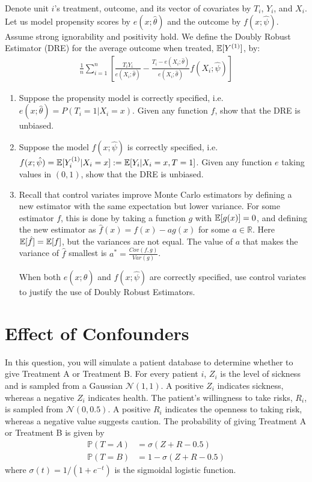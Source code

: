 \documentclass[11pt]{article}
\begin{document}
Denote unit $i$'s treatment, outcome, and its vector of covariates by $T_i$, $Y_i$, and $X_i$. Let us model propensity scores by $e(x;\hat\theta)$ and the outcome by $f(x;\hat{\psi})$. Assume strong ignorability and positivity hold. We define the Doubly Robust Estimator (DRE) for the average outcome when treated, $\mathbb{E}[Y^{(1)}]$, by:
\begin{align}
    \frac{1}{n}\sum_{i=1}^n \left[\frac{T_iY_i}{e(X_i;\hat\theta)} - \frac{T_i - e(X_i;\hat\theta)}{e(X_i;\hat\theta)}f(X_i;\hat{\psi})\right]
\end{align}
\begin{enumerate}[label=(\Alph*)]

    \item Suppose the propensity model is correctly specified, i.e. $e(x;\hat\theta) = P(T_i=1|X_i=x)$. Given any function $f$, show that the DRE is unbiased.


    \item Suppose the model $f(x;\hat\psi)$ is correctly specified, i.e. $f(x;\hat\psi) = \mathbb{E}[Y_i^{(1)}|X_i=x] := \mathbb{E}[Y_i|X_i=x,T=1]$. Given any function $e$ taking values in $(0,1)$, show that the DRE is unbiased.


    \item Recall that control variates improve Monte Carlo estimators by defining a new estimator with the same expectation but lower variance. For some estimator $f$, this is done by taking a function $g$ with $\mathbb{E}[g(x)] = 0$, and defining the new estimator as $\hat{f}(x)=f(x) - ag(x)$ for some $a \in \mathbb{R}$. Here $\mathbb{E}[\hat{f}] =\mathbb{E}[f]$, but the variances are not equal. The value of $a$ that makes the variance of $\hat{f}$ smallest is $a^* = \frac{Cov(f,g)}{Var(g)}$.

    When both $e(x;\hat\theta)$ and $f(x;\hat\psi)$ are correctly specified, use control variates to justify the use of Doubly Robust Estimators.

\end{enumerate}

\newpage 

\section{Effect of Confounders}

\noindent In this question, you will simulate a patient database to determine whether to give Treatment A or Treatment B. 
For every patient $i$, $Z_i$ is the level of sickness and is sampled from a Gaussian $\mathcal{N}(1, 1)$. 
A positive $Z_i$ indicates sickness, whereas a negative $Z_i$ indicates health. 
The patient's willingness to take risks, $R_i$, is sampled from $\mathcal{N}(0, 0.5)$.
A positive $R_i$ indicates the openness to taking risk, whereas a negative value suggests caution. 
The probability of giving Treatment A or Treatment B is given by 
\begin{align*}
    \mathbb{P}(T = A) &= \sigma(Z + R - 0.5) \\ 
    \mathbb{P}(T = B) &= 1- \sigma(Z + R - 0.5)
\end{align*}
where $\sigma(t) = 1/(1+e^{-t})$ is the sigmoidal logistic function. \newline
\end{document}
